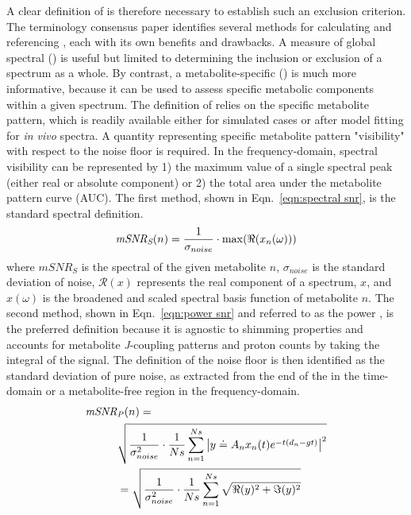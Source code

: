 A clear definition of \SNR is therefore necessary to establish such an exclusion criterion. The terminology consensus paper \cite{Kreis2020} identifies several methods for calculating and referencing \SNR, each with its own benefits and drawbacks. A measure of global spectral \SNR (\gSNR) is useful but limited to determining the inclusion or exclusion of a spectrum as a whole. By contrast, a metabolite-specific \SNR (\mSNR) is much more informative, because it can be used to assess specific metabolic components within a given spectrum. The definition of \mSNR relies on the specific metabolite pattern, which is readily available either for simulated cases or after model fitting for \textit{in vivo} spectra. A quantity representing specific metabolite pattern "visibility" with respect to the noise floor is required. In the frequency-domain, spectral visibility can be represented by 1) the maximum value of a single spectral peak (either real or absolute component) or 2) the total area under the metabolite pattern curve (AUC). The first method, shown in Eqn.~\ref{eqn:spectral snr}, is the standard spectral \SNR definition. 
\begin{equation}\label{eqn:spectral snr}
    \textnormal{\textit{mSNR\textsubscript{S}}}(n) = \frac{1}{\sigma_{noise}}\cdot \max(\Re(x_n(\omega)))
\end{equation}
where $mSNR_S$ is the spectral \SNR of the given metabolite $n$, $\sigma_{noise}$ is the standard deviation of noise, $\mathcal{R}(x)$ represents the real component of a spectrum, $x$, and $x(\omega)$ is the broadened and scaled spectral basis function of metabolite $n$. The second method, shown in Eqn.~\ref{eqn:power snr} and referred to as the power \SNR, is the preferred definition because it is agnostic to shimming properties and accounts for metabolite \textit{J}-coupling patterns and proton counts by taking the integral of the signal. The definition of the noise floor is then identified as the standard deviation of pure noise, as extracted from the end of the \FID in the time-domain or a metabolite-free region in the frequency-domain.
\begin{equation}\label{eqn:power snr}
    \begin{aligned}
        \textit{mSNR}&\textsubscript{\textit{P}}(n) = \\&\sqrt{\frac{1}{\sigma_{noise}^2}\cdot \frac{1}{Ns}\sum_{n=1}^{Ns}\left|y\doteq A_n x_n(t) e^{-t(d_n-gt)} \right|^2}\\
         &= \sqrt{\frac{1}{\sigma_{noise}^2}\cdot \frac{1}{Ns}\sum_{n=1}^{Ns}\sqrt{\Re(y)^2 + \Im(y)^2}}
     \end{aligned}
\end{equation}
